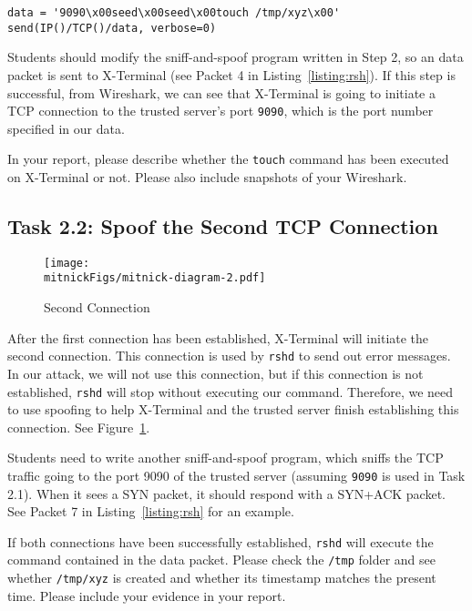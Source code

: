 \begin{lstlisting}
data = '9090\x00seed\x00seed\x00touch /tmp/xyz\x00'
send(IP()/TCP()/data, verbose=0)
\end{lstlisting}
 

Students should modify the sniff-and-spoof program written in Step 2, so
an \rsh data packet is sent to X-Terminal (see Packet 4 
in Listing~\ref{listing:rsh}). 
If this step is successful, from Wireshark, we can see
that X-Terminal is going to initiate a TCP connection to the trusted server's port
\texttt{9090}, which is the port number specified in our \rsh data.  

In your report, please describe whether the \texttt{touch} command 
has been executed on X-Terminal or not. Please also 
include snapshots of your Wireshark. 


\subsection{Task 2.2: Spoof the Second TCP Connection}
\label{sec:second-conn}

\begin{figure}[htb]
\centering
\texttt{[image: \\mitnickFigs/mitnick-diagram-2.pdf]}
\caption{Second Connection}
\label{fig:second-conn}
\end{figure}


After the first connection has been established, X-Terminal will initiate 
the second connection. This connection is used by \texttt{rshd} to send 
out error messages. In our attack, we will not use this connection, but
if this connection is not established, \texttt{rshd} will stop without 
executing our command. Therefore, we need to use spoofing 
to help X-Terminal and the trusted server finish establishing this connection. 
See Figure~\ref{fig:second-conn}. 


Students need to write another sniff-and-spoof program, which
sniffs the TCP traffic going to the port 9090 of the trusted server (assuming
\texttt{9090} is used in Task 2.1). When it sees a SYN packet,
it should respond with a SYN+ACK packet. See Packet 7 
in Listing~\ref{listing:rsh} for an example.

If both connections have been successfully established, \texttt{rshd} 
will execute the command contained in the \rsh data packet. Please 
check the \texttt{/tmp} folder and see whether \texttt{/tmp/xyz} is created
and whether its timestamp matches the present time. Please 
include your evidence in your report. 



